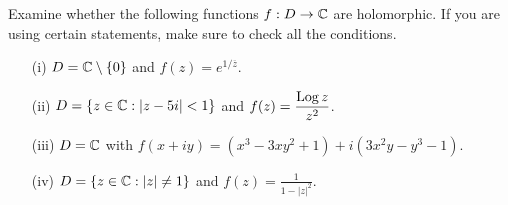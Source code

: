 \documentclass[a4paper]{article}
\begin{document}
\begin{problem}
   Examine whether the following functions \( f: D \to \mathbb{C}  \) are holomorphic. If you are using certain statements, make sure to check all the conditions.
   \begin{enumerate}
       \item[(i)] \( D = \mathbb{C} \setminus  \{ 0 \}  \) and \( f(z) = e^{1/ \overline{z}} \).
        \item[(ii)] \( D = \{ z \in \mathbb{C} : | z - 5i |  < 1 \}   \) and \( f(z) = \displaystyle \frac{ \operatorname{Log} z }{ z^{2} }  \).
        \item[(iii)] \( D = \mathbb{C}  \) with \( f(x  + iy) = (x^{3} - 3x y^{2} + 1) + i (3 x^{2} y - y^{3} - 1). \)
        \item[(iv)] \( D = \{ z \in \mathbb{C} : | z  |  \neq 1  \}  \) and \( f(z) = \displaystyle \frac{ 1 }{ 1 - | z |^{2} } \).
   \end{enumerate}
\end{problem}
\end{document}
